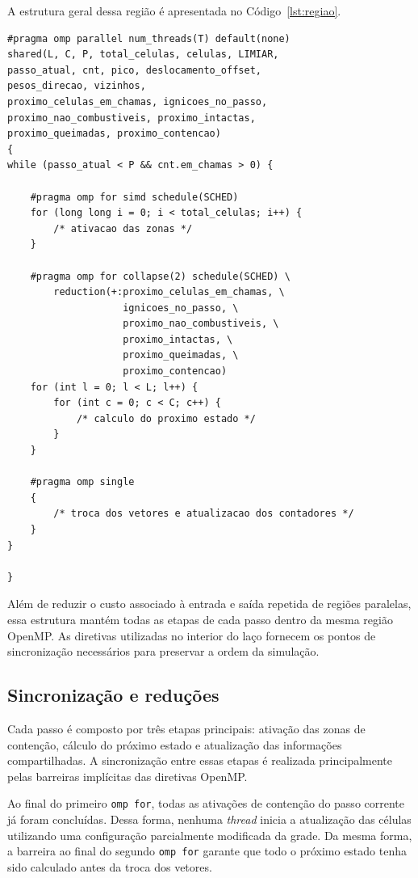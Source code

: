 \documentclass[11pt,a4paper]{article}
\begin{document}
A estrutura geral dessa região é apresentada no Código~\ref{lst:regiao}.

\begin{lstlisting}[caption={Estrutura da região paralela persistente de \texttt{fire\_omp.c}.},label={lst:regiao}]
#pragma omp parallel num_threads(T) default(none) 
shared(L, C, P, total_celulas, celulas, LIMIAR, 
passo_atual, cnt, pico, deslocamento_offset, 
pesos_direcao, vizinhos, 
proximo_celulas_em_chamas, ignicoes_no_passo, 
proximo_nao_combustiveis, proximo_intactas, 
proximo_queimadas, proximo_contencao)
{
while (passo_atual < P && cnt.em_chamas > 0) {

    #pragma omp for simd schedule(SCHED)
    for (long long i = 0; i < total_celulas; i++) {
        /* ativacao das zonas */
    }

    #pragma omp for collapse(2) schedule(SCHED) \
        reduction(+:proximo_celulas_em_chamas, \
                    ignicoes_no_passo, \
                    proximo_nao_combustiveis, \
                    proximo_intactas, \
                    proximo_queimadas, \
                    proximo_contencao)
    for (int l = 0; l < L; l++) {
        for (int c = 0; c < C; c++) {
            /* calculo do proximo estado */
        }
    }

    #pragma omp single
    {
        /* troca dos vetores e atualizacao dos contadores */
    }
}

}
\end{lstlisting}

Além de reduzir o custo associado à entrada e saída repetida de regiões paralelas, essa estrutura mantém todas as etapas de cada passo dentro da mesma região OpenMP. As diretivas utilizadas no interior do laço fornecem os pontos de sincronização necessários para preservar a ordem da simulação.

\subsection{Sincronização e reduções}
\label{sec:sincronizacao}

Cada passo é composto por três etapas principais: ativação das zonas de contenção, cálculo do próximo estado e atualização das informações compartilhadas. A sincronização entre essas etapas é realizada principalmente pelas barreiras implícitas das diretivas OpenMP.

Ao final do primeiro \texttt{omp for}, todas as ativações de contenção do passo corrente já foram concluídas. Dessa forma, nenhuma \emph{thread} inicia a atualização das células utilizando uma configuração parcialmente modificada da grade. Da mesma forma, a barreira ao final do segundo \texttt{omp for} garante que todo o próximo estado tenha sido calculado antes da troca dos vetores.
\end{document}
